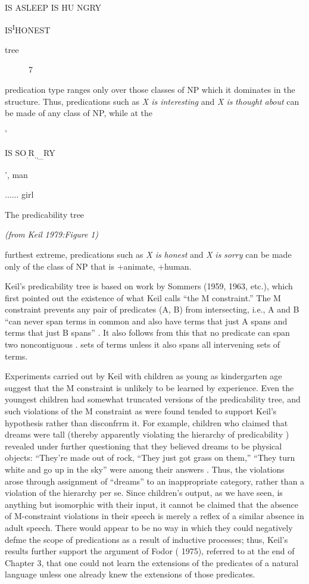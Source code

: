 IS ASLEEP IS HU NGRY

IS\textsuperscript{I}HONEST 

tree

\begin{figure}
\caption{7}
\label{fig:4}
\end{figure}

predication type ranges only over those classes of NP which it domi\-nates in the structure. Thus, predications such as \textit{X is interesting} and \textit{X is} \textit{thought} \textit{about} can be made of any class of NP, while at the

'

IS SO\textsubscript{.}R\textsubscript{.,}\textsubscript{\_}RY

', man 

...... girl

The predicability tree

\textit{(from} \textit{Keil} \textit{1979:Figure} \textit{1)}


furthest extreme, predications such as \textit{X is} \textit{honest} and \textit{X} \textit{is} \textit{sorry} can be made only of the class of NP that is +animate, +human.

Keil's predicability tree is based on work by Sommers (1959, 1963, etc.), which first pointed out the existence of what Keil calls ``the M constraint.'' The M constraint prevents any pair of predicates (A, B) from intersecting, i.e., A and B ``can never span terms in com\-mon and also have terms that just A spans and terms that just B spans'' \citep[16]{Keil1979}. It also follows from this that no predicate can span two noncontiguous . sets of terms unless it also spans all intervening sets of terms.

Experiments carried out by Keil with children as young as kindergarten age suggest that the M constraint is unlikely to be learned by experience. Even the youngest children had somewhat truncated versions of the predicability tree, and such violations of the M con\-straint as were found tended to support Keil's hypothesis rather than disconfrrm it. For example, children who claimed that dreams were tall (thereby apparently violating the hierarchy of predicability ) re\-vealed under further questioning that they believed dreams to be physical objects: ``They're made out of rock,{\textquotedbl} ``They just got grass on them,'' ``They turn white and go up in the sky'' were among their answers \citep[110]{Keil1979}. Thus, the violations arose through assignment of ``dreams'' to an inappropriate category, rather than a violation of the hierarchy per se. Since children's output, as we have seen, is any\-thing but isomorphic with their input, it cannot be claimed that the absence of M-constraint violations in their speech is merely a reflex of a similar absence in adult speech. There would appear to be no way in which they could negatively defme the scope of predications as a result of inductive processes; thus, Keil's results further support the argument of Fodor ( 1975), referred to at the end of Chapter 3, that one could not learn the extensions of the predicates of a natural lan\-guage unless one already knew the extensions of those predicates.

